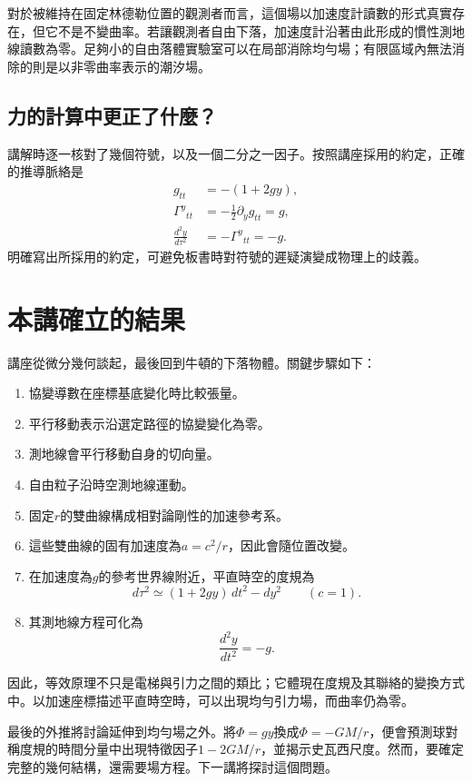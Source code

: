 對於被維持在固定林德勒位置的觀測者而言，這個場以加速度計讀數的形式真實存在，但它不是不變曲率。若讓觀測者自由下落，加速度計沿著由此形成的慣性測地線讀數為零。足夠小的自由落體實驗室可以在局部消除均勻場；有限區域內無法消除的則是以非零曲率表示的潮汐場。

\subsection{力的計算中更正了什麼？}

講解時逐一核對了幾個符號，以及一個二分之一因子。按照講座採用的約定，正確的推導脈絡是
\begin{equation}
\begin{aligned}
g_{tt}&=-(1+2gy),\\
\Gamma^y{}_{tt}&=-\frac12\partial_yg_{tt}=g,\\
\frac{d^2y}{d\tau^2}&=-\Gamma^y{}_{tt}=-g.
\end{aligned}
\end{equation}
明確寫出所採用的約定，可避免板書時對符號的遲疑演變成物理上的歧義。

\section{本講確立的結果}

講座從微分幾何談起，最後回到牛頓的下落物體。關鍵步驟如下：
\begin{enumerate}
\item 協變導數在座標基底變化時比較張量。
\item 平行移動表示沿選定路徑的協變變化為零。
\item 測地線會平行移動自身的切向量。
\item 自由粒子沿時空測地線運動。
\item 固定\(r\)的雙曲線構成相對論剛性的加速參考系。
\item 這些雙曲線的固有加速度為\(a=c^2/r\)，因此會隨位置改變。
\item 在加速度為\(g\)的參考世界線附近，平直時空的度規為
\begin{equation}
d\tau^2\simeq(1+2gy)\,dt^2-dy^2
\qquad(c=1).
\end{equation}
\item 其測地線方程可化為
\begin{equation}
\frac{d^2y}{dt^2}=-g.
\end{equation}
\end{enumerate}

因此，等效原理不只是電梯與引力之間的類比；它體現在度規及其聯絡的變換方式中。以加速座標描述平直時空時，可以出現均勻引力場，而曲率仍為零。

最後的外推將討論延伸到均勻場之外。將\(\Phi=gy\)換成\(\Phi=-GM/r\)，便會預測球對稱度規的時間分量中出現特徵因子\(1-2GM/r\)，並揭示史瓦西尺度。然而，要確定完整的幾何結構，還需要場方程。下一講將探討這個問題。
